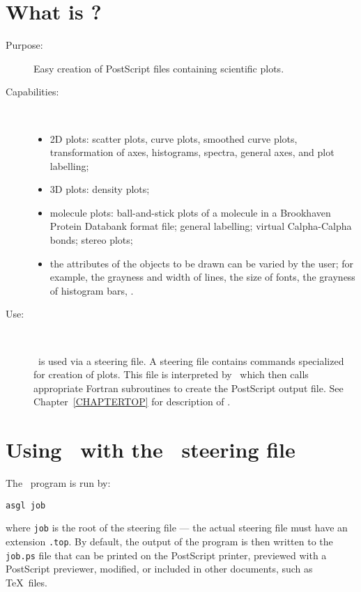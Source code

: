 \section{What is \ASGL ?}


\begin{description}

\item[Purpose:] 
      Easy creation of PostScript files containing scientific plots.


\item[Capabilities:] \ 

\begin{itemize}
\item 2D plots: 
      scatter plots, curve plots, smoothed curve plots, transformation 
      of axes, histograms, spectra, general axes, and plot labelling;

\item 3D plots: density plots;

\item molecule plots: 
      ball-and-stick plots of a molecule in a Brookhaven Protein Databank
      format file; general labelling; virtual Calpha-Calpha 
      bonds; stereo plots;

\item the attributes of the objects to be drawn can be varied by the user;
   for example, the grayness and width of lines, the size of fonts,
   the grayness of histogram bars, \etc.
\end{itemize}

    
\item[Use:] \ 

\ASGL\ is used via a steering file. A steering file contains commands 
specialized for creation of plots. This file is interpreted by \TOP\ which 
then calls appropriate Fortran subroutines to create the PostScript output
file. See Chapter~\ref{CHAPTERTOP} for description of \TOP.
\end{description}


\newpage


\section{Using \ASGL\ with the \TOP\ steering file}

The \ASGL\ program is run by:

{\tt asgl job}

\noindent where {\tt job} is the root of the steering file --- the actual 
steering file must have an extension {\tt .top}. By default, the output of 
the program is then written to the {\tt job.ps} file that can be printed on the
PostScript printer, previewed with a PostScript previewer, modified,
or included in other documents, such as \TeX\ files.

